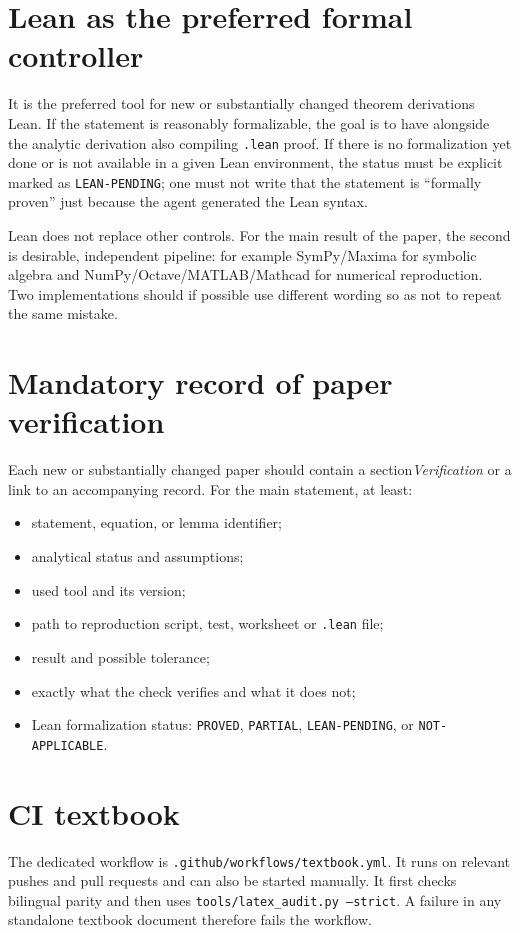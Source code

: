 \section{Lean as the preferred formal controller}
It is the preferred tool for new or substantially changed theorem derivations
Lean. If the statement is reasonably formalizable, the goal is to have alongside the analytic
derivation also compiling \texttt{.lean} proof. If there is no formalization yet
done or is not available in a given Lean environment, the status must be explicit
marked as \texttt{LEAN-PENDING}; one must not write that the statement is ``formally
proven'' just because the agent generated the Lean syntax.

Lean does not replace other controls. For the main result of the paper, the second is desirable,
independent pipeline: for example SymPy/Maxima for symbolic algebra and
NumPy/Octave/MATLAB/Mathcad for numerical reproduction. Two implementations should
if possible use different wording so as not to repeat the same mistake.

\section{Mandatory record of paper verification}
Each new or substantially changed paper should contain a section\emph{Verification}
or a link to an accompanying record. For the main statement, at least:
\begin{itemize}
 \item statement, equation, or lemma identifier;
 \item analytical status and assumptions;
 \item used tool and its version;
 \item path to reproduction script, test, worksheet or \texttt{.lean}
       file;
 \item result and possible tolerance;
 \item exactly what the check verifies and what it does not;
 \item Lean formalization status: \texttt{PROVED}, \texttt{PARTIAL},
       \texttt{LEAN-PENDING}, or \texttt{NOT-APPLICABLE}.
\end{itemize}

\section{CI textbook}
The dedicated workflow is \texttt{.github/workflows/textbook.yml}. It runs on
relevant pushes and pull requests and can also be started manually. It first
checks bilingual parity and then uses \texttt{tools/latex\_audit.py --strict}.
A failure in any standalone textbook document therefore fails the workflow.

